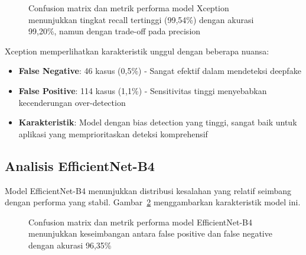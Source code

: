 \begin{figure}[H]
    \centering
    \caption{Confusion matrix dan metrik performa model Xception menunjukkan tingkat recall tertinggi (99,54\%) dengan akurasi 99,20\%, namun dengan trade-off pada precision}
    \label{fig:conf_matrix_xception}
\end{figure}

Xception memperlihatkan karakteristik unggul dengan beberapa nuansa:
\begin{itemize}
    \item \textbf{False Negative}: 46 kasus (0,5\%) - Sangat efektif dalam mendeteksi deepfake
    \item \textbf{False Positive}: 114 kasus (1,1\%) - Sensitivitas tinggi menyebabkan kecenderungan over-detection
    \item \textbf{Karakteristik}: Model dengan bias detection yang tinggi, sangat baik untuk aplikasi yang memprioritaskan deteksi komprehensif
\end{itemize}

\subsection{Analisis EfficientNet-B4}

Model EfficientNet-B4 menunjukkan distribusi kesalahan yang relatif seimbang dengan performa yang stabil. Gambar~\ref{fig:conf_matrix_efficientnet} menggambarkan karakteristik model ini.

\begin{figure}[H]
    \centering
    \caption{Confusion matrix dan metrik performa model EfficientNet-B4 menunjukkan keseimbangan antara false positive dan false negative dengan akurasi 96,35\%}
    \label{fig:conf_matrix_efficientnet}
\end{figure}

